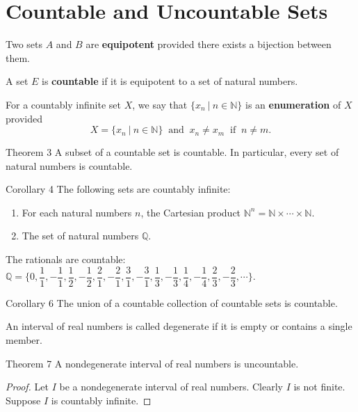 \documentclass[a4paper,10pt]{book}
\theoremstyle{plain} %
\newcommand{\thistheoremname}{}
\newtheorem*{genericthm*}{\thistheoremname}
\newenvironment{namedthm*}[1]
	{\renewcommand{\thistheoremname}{#1}%
	\begin{genericthm*}}
	{\end{genericthm*}}
\begin{document}
\section{Countable and Uncountable Sets}

\begin{flushleft}

Two sets $A$ and $B$ are \textbf{equipotent} provided there exists a bijection between them.\par
A set $E$ is \textbf{countable} if it is equipotent to a set of natural numbers.\par
For a countably infinite set $X$, we say that $\{x_n \ |\ n \in \mathbb{N} \}$ is an \textbf{enumeration} of $X$ provided
\[
	X = \{x_n \ |\ n \in \mathbb{N} \} \ \text{ and }\ x_n \neq x_m \ \text{ if }\ n \neq m. 
\]
\par
\medskip
\begin{namedthm*}{Theorem 3}
	A subset of a countable set is countable. In particular, every set of natural numbers is countable.
\end{namedthm*}
\begin{namedthm*}{Corollary 4}
	The following sets are countably infinite:
	\begin{enumerate}[label=(\roman*),align=left]
		\item For each natural numbers $n$, the Cartesian product $\mathbb{N}^n = \mathbb{N} \times \cdots \times \mathbb{N}$.
		\item The set of natural numbers $\mathbb{Q}$.
	\end{enumerate}
\end{namedthm*}
\par
\medskip
The rationals are countable: 
$\mathbb{Q} = \{0,\dfrac{1}{1},-\dfrac{1}{1},\dfrac{1}{2},-\dfrac{1}{2},\dfrac{2}{1},-\dfrac{2}{1}, \dfrac{3}{1}, -\dfrac{3}{1},\dfrac{1}{3},-\dfrac{1}{3},\dfrac{1}{4},-\dfrac{1}{4},\dfrac{2}{3},-\dfrac{2}{3},\cdots \}$.
\par
\medskip
\begin{namedthm*}{Corollary 6}
The union of a countable collection of countable sets is countable.
\end{namedthm*}
An interval of real numbers is called degenerate if it is empty or contains a single member.
\begin{namedthm*}{Theorem 7}
A nondegenerate interval of real numbers is uncountable.	
\end{namedthm*}
\begin{proof}
Let $I$ be a nondegenerate interval of real numbers. Clearly $I$ is not finite. Suppose $I$ is countably infinite.

\end{proof}
\end{flushleft}
\end{document}

